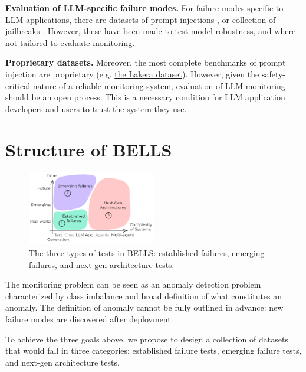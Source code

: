 \documentclass{article}
\newcommand{\todoAlexandre}[1]{\todo[color=red!40]{Alexandre: #1}}
\begin{document}
\textbf{Evaluation of LLM-specific failure modes.} For failure modes
specific to LLM applications, there are
\href{https://github.com/lakeraai/pint-benchmark}{datasets of prompt injections} \cite{lakera-pint},
or \href{https://github.com/verazuo/jailbreak_llms}{collection of jailbreaks} \cite{Shen2023DoAN}.
However, these have been made to test model robustness, and where not tailored to
evaluate monitoring.

\textbf{Proprietary datasets.} Moreover, the most complete benchmarks of
prompt injection are proprietary (e.g.
\href{http://lakera.ai/}{the Lakera dataset})\todoAlexandre{Reference!!}. However, given the
safety-critical nature of a reliable monitoring system,
evaluation of LLM monitoring should be an open process. This is a necessary
condition for LLM application developers and users to trust the system they use. 


\section{Structure of BELLS}
\begin{figure}
   \centering
   \includegraphics[width=0.5\textwidth]{images/types-of-tests.pdf}
   \caption{The three types of tests in BELLS: established failures, emerging failures, and next-gen architecture tests.}
\end{figure}

The monitoring problem can be seen as an anomaly detection problem
characterized by class imbalance and broad definition of what
constitutes an anomaly. The definition of anomaly cannot be fully
outlined in advance: new failure modes are discovered after deployment.

To achieve the three goals above, we propose to design a collection of
datasets that would fall in three categories:
established failure tests,
emerging failure tests,
and next-gen architecture tests.
   
\end{document}
